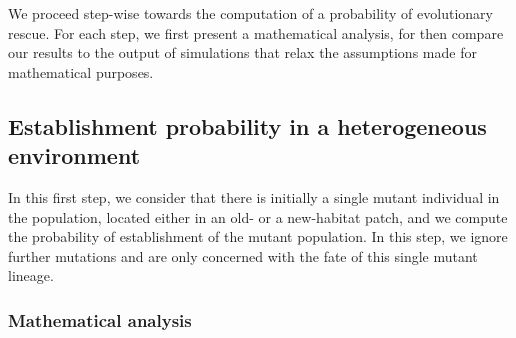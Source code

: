\documentclass[11pt]{article}
\newcommand{\florence}[1]{\textcolor{purple}{(#1)}} %
\newcommand{\chg}[1]{\textcolor{change}{#1}}
\begin{document}

We proceed step-wise towards the computation of a probability of evolutionary rescue. For each step, we first present a mathematical analysis, for then compare our results to the output of simulations that relax the assumptions made for mathematical purposes. 


\subsection*{Establishment probability in a heterogeneous environment}\label{subsec:establishment}

In this first step, we consider that there is initially a single mutant individual in the population, located either in an old- or a new-habitat patch, and we compute the probability of establishment of the mutant population. In this step, we ignore further mutations and are only concerned with the fate of this single mutant lineage. 

\subsubsection*{Mathematical analysis}
\end{document}
